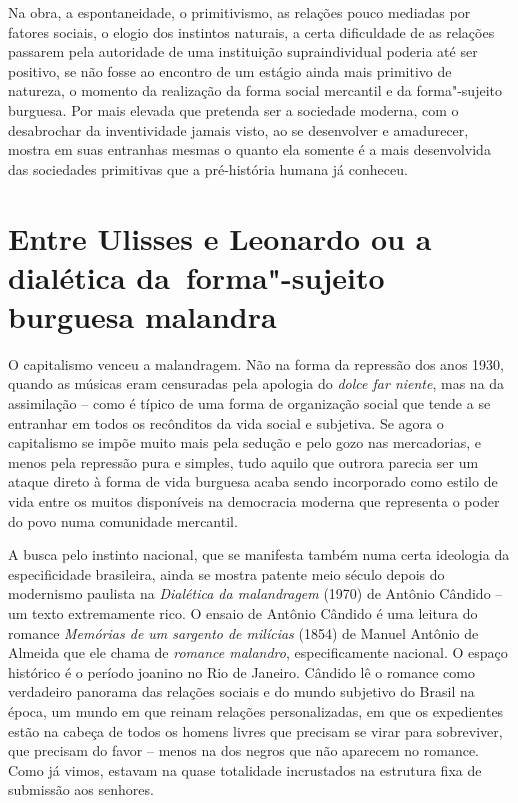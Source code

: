 {Na obra, a espontaneidade, o primitivismo, as relações pouco mediadas
por fatores sociais, o elogio dos instintos naturais, a certa
dificuldade de as relações passarem pela autoridade de uma instituição
supraindividual poderia até ser positivo, se não fosse ao encontro de um
estágio ainda mais primitivo de natureza, o momento da realização da
forma social mercantil e da forma"-sujeito burguesa. Por mais elevada que
pretenda ser a sociedade moderna, com o desabrochar da inventividade
jamais visto, ao se desenvolver e amadurecer, mostra em suas entranhas
mesmas o quanto ela somente é a mais desenvolvida das sociedades
primitivas que a pré-história humana já conheceu.

\section*{Entre Ulisses e Leonardo ou a dialética da~forma"-sujeito burguesa malandra}

O capitalismo venceu a malandragem. Não na forma da repressão dos anos
1930, quando as músicas eram censuradas pela apologia do \emph{dolce far
niente}, mas na da assimilação -- como é típico de uma forma de
organização social que tende a se entranhar em todos os recônditos da
vida social e subjetiva. Se agora o capitalismo se impõe muito mais pela
sedução e pelo gozo nas mercadorias, e menos pela repressão pura e
simples, tudo aquilo que outrora parecia ser um ataque direto à forma de
vida burguesa acaba sendo incorporado como estilo de vida entre os
muitos disponíveis na democracia moderna que representa o poder do povo
numa comunidade mercantil.

A busca pelo instinto nacional, que se manifesta também numa certa
ideologia da especificidade brasileira, ainda se mostra patente meio
século depois do modernismo paulista na \emph{Dialética da malandragem}
(1970) de Antônio Cândido -- um texto extremamente rico. O
ensaio de Antônio Cândido é uma leitura do romance \emph{Memórias de um
sargento de milícias} (1854) de Manuel Antônio de Almeida que ele chama
de \emph{romance malandro}, especificamente nacional. O espaço histórico
é o período joanino no Rio de Janeiro. Cândido lê o romance como
verdadeiro panorama das relações sociais e do mundo subjetivo do Brasil
na época, um mundo em que reinam relações personalizadas, em que os
expedientes estão na cabeça de todos os homens livres que precisam se
virar para sobreviver, que precisam do favor -- menos na dos negros que
não aparecem no romance. Como já vimos, estavam na quase totalidade
incrustados na estrutura fixa de submissão aos senhores.

}
